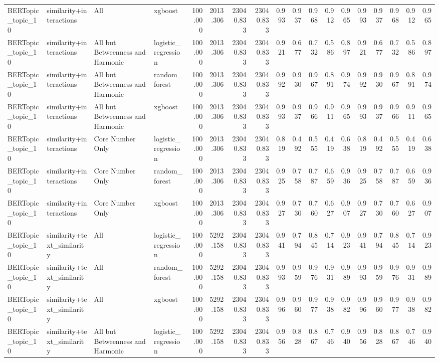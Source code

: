 \begin{tabular}{llllrrrrrrrrrrrrrr}
BERTopic\_topic\_10 & similarity+interactions & All & xgboost & 100.000 & 2013.306 & 23040.833 & 23040.833 & 0.993 & 0.937 & 0.968 & 0.912 & 0.965 & 0.993 & 0.937 & 0.968 & 0.912 & 0.965 \\
BERTopic\_topic\_10 & similarity+interactions & All but Betweenness and Harmonic & logistic\_regression & 100.000 & 2013.306 & 23040.833 & 23040.833 & 0.921 & 0.677 & 0.732 & 0.586 & 0.897 & 0.921 & 0.677 & 0.732 & 0.586 & 0.897 \\
BERTopic\_topic\_10 & similarity+interactions & All but Betweenness and Harmonic & random\_forest & 100.000 & 2013.306 & 23040.833 & 23040.833 & 0.992 & 0.930 & 0.967 & 0.891 & 0.974 & 0.992 & 0.930 & 0.967 & 0.891 & 0.974 \\
BERTopic\_topic\_10 & similarity+interactions & All but Betweenness and Harmonic & xgboost & 100.000 & 2013.306 & 23040.833 & 23040.833 & 0.993 & 0.937 & 0.966 & 0.911 & 0.965 & 0.993 & 0.937 & 0.966 & 0.911 & 0.965 \\
BERTopic\_topic\_10 & similarity+interactions & Core Number Only & logistic\_regression & 100.000 & 2013.306 & 23040.833 & 23040.833 & 0.819 & 0.492 & 0.555 & 0.419 & 0.638 & 0.819 & 0.492 & 0.555 & 0.419 & 0.638 \\
BERTopic\_topic\_10 & similarity+interactions & Core Number Only & random\_forest & 100.000 & 2013.306 & 23040.833 & 23040.833 & 0.925 & 0.758 & 0.787 & 0.659 & 0.936 & 0.925 & 0.758 & 0.787 & 0.659 & 0.936 \\
BERTopic\_topic\_10 & similarity+interactions & Core Number Only & xgboost & 100.000 & 2013.306 & 23040.833 & 23040.833 & 0.927 & 0.730 & 0.760 & 0.627 & 0.907 & 0.927 & 0.730 & 0.760 & 0.627 & 0.907 \\
BERTopic\_topic\_10 & similarity+text\_similarity & All & logistic\_regression & 100.000 & 5292.158 & 23040.833 & 23040.833 & 0.941 & 0.794 & 0.845 & 0.714 & 0.923 & 0.941 & 0.794 & 0.845 & 0.714 & 0.923 \\
BERTopic\_topic\_10 & similarity+text\_similarity & All & random\_forest & 100.000 & 5292.158 & 23040.833 & 23040.833 & 0.993 & 0.959 & 0.976 & 0.931 & 0.989 & 0.993 & 0.959 & 0.976 & 0.931 & 0.989 \\
BERTopic\_topic\_10 & similarity+text\_similarity & All & xgboost & 100.000 & 5292.158 & 23040.833 & 23040.833 & 0.996 & 0.960 & 0.977 & 0.938 & 0.982 & 0.996 & 0.960 & 0.977 & 0.938 & 0.982 \\
BERTopic\_topic\_10 & similarity+text\_similarity & All but Betweenness and Harmonic & logistic\_regression & 100.000 & 5292.158 & 23040.833 & 23040.833 & 0.956 & 0.828 & 0.867 & 0.746 & 0.940 & 0.956 & 0.828 & 0.867 & 0.746 & 0.940 \\

\end{tabular}
